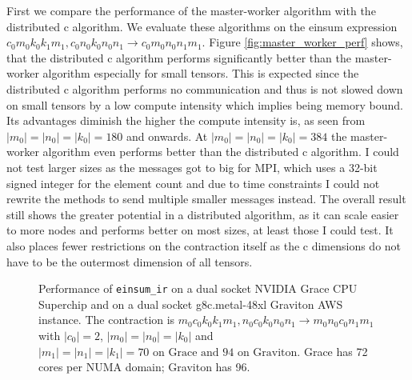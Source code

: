 First we compare the performance of the master-worker algorithm with the distributed c algorithm.
We evaluate these algorithms on the einsum expression $c_0m_0k_0k_1m_1, c_0n_0k_0n_0n_1 \rightarrow c_0m_0n_0n_1m_1$.
Figure \ref{fig:master_worker_perf} shows, that the distributed c algorithm performs significantly better than the master-worker algorithm especially for small tensors.
This is expected since the distributed c algorithm performs no communication and thus is not slowed down on small tensors by a low compute intensity which implies being memory bound.
Its advantages diminish the higher the compute intensity is, as seen from $|m_0|=|n_0|=|k_0|= 180$ and onwards.
At $|m_0|=|n_0|=|k_0|= 384$ the master-worker algorithm even performs better than the distributed c algorithm.
I could not test larger sizes as the messages got to big for MPI, which uses a 32-bit signed integer for the element count and due to time constraints I could not rewrite the methods to send multiple smaller messages instead.
The overall result still shows the greater potential in a distributed algorithm, as it can scale easier to more nodes and performs better on most sizes, at least those I could test.
It also places fewer restrictions on the contraction itself as the c dimensions do not have to be the outermost dimension of all tensors.

\begin{figure}[ht]
  \caption{
    Performance of \texttt{einsum\_ir} on a dual socket NVIDIA Grace CPU Superchip and on a dual socket g8c.metal-48xl Graviton AWS instance.
    The contraction is $m_0c_0k_0k_1m_1, n_0c_0k_0n_0n_1 \rightarrow m_0n_0c_0n_1m_1$ with $|c_0|=2$, $|m_0|=|n_0|=|k_0|$ and $|m_1|=|n_1|=|k_1|=70\text{ on Grace and } 94\text{ on Graviton}$.
    Grace has 72 cores per NUMA domain; Graviton has 96.
    }
  \label{fig:einsum_ir_perf}
\end{figure}

